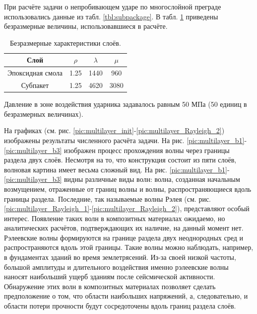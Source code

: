 При расчёте задачи о непробивающем ударе по многослойной преграде использовались
данные из табл. \ref{tbl:subpackage}. В табл. \ref{tbl:subpackage_2} приведены
безразмерные величины, использовавшиеся в расчёте.
\begin{table}[h]
\centering
\begin{tabular}{|c|c|c|c|}
\hline
Слой & $\rho$ & $\lambda$ & $\mu$  \\
\hline
Эпоксидная смола & 1.25 & 1440 & 960 \\
Субпакет & 1.25 & 4620 & 3080 \\
\hline
\end{tabular}
\caption{Безразмерные характеристики слоёв.}
\label{tbl:subpackage_2}
\end{table}

Давление в зоне воздействия ударника задавалось равным 50 МПа (50 единиц в безразмерных величинах).

На графиках (см. рис. \ref{pic:multilayer_init}-\ref{pic:multilayer_Rayleigh_2})
изображены результаты численного расчёта задачи.
На рис. \ref{pic:multilayer_b1}-\ref{pic:multilayer_b3} изображен процесс
прохождения волны через границы раздела двух слоёв. Несмотря на то, что
конструкция состоит из пяти слоёв, волновая картина имеет весьма сложный
вид. На рис. \ref{pic:multilayer_b1}-\ref{pic:multilayer_b3} видны различные
виды волн: волна, созданная начальным возмущением, отраженные от границ волны и
волны, распространяющиеся вдоль границы раздела. Последние, так называемые волны
Рэлея (см. рис. \ref{pic:multilayer_Rayleigh_1}-\ref{pic:multilayer_Rayleigh_2}), 
представляют особый интерес. Появление таких волн в композитных материалах
ожидаемо, но аналитических расчётов, подтверждающих их наличие, на данный момент
нет. Рэлеевские волны формируются на границе раздела двух неоднородных сред и
распространяются вдоль этой границы. Такие волны можно наблюдать, например, в фундаментах
зданий во время землетрясений. Из-за своей низкой частоты, большой
амплитуды и длительного воздействия именно рэлеевские волны наносят наибольший
ущерб зданиям после сейсмической активности. Обнаружение этих волн в композитных
материалах позволяет сделать предположение о том, что области наибольших
напряжений, а, следовательно, и области потери прочности будут сосредоточены
вдоль границ раздела слоёв.


